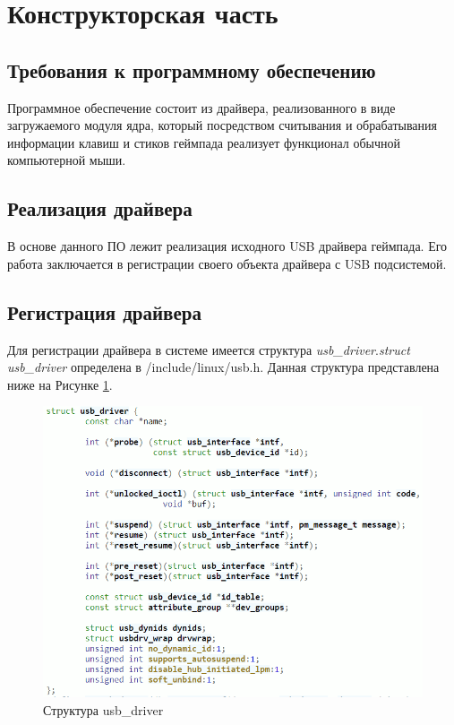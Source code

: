 \section{Конструкторская часть}

\subsection{Требования к программному обеспечению}
Программное обеспечение состоит из драйвера, реализованного в виде
загружаемого модуля ядра, который посредством считывания и обрабатывания информации клавиш и стиков геймпада
реализует функционал обычной компьютерной мыши.

\subsection{Реализация драйвера}
В основе данного ПО лежит реализация исходного USB драйвера геймпада.
Его работа заключается в регистрации своего объекта драйвера с USB
подсистемой.

\subsection{Регистрация драйвера}
Для регистрации драйвера в системе имеется структура \textit{usb\_driver}.\textit{struct
usb\_driver} определена в /include/linux/usb.h. Данная структура представлена ниже на Рисунке \ref{USB-driver}. 

\begin{figure}[h!]
	\centering
	\includegraphics[scale=0.88]{img/usb-driver.png}
	\caption{Структура usb\_driver}
	\label{USB-driver}
\end{figure}\par

